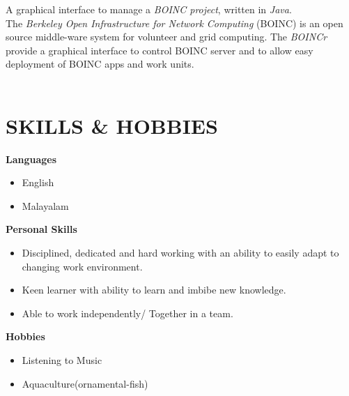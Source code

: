 \documentclass[line,margin]{res}
\begin{document}
\begin{resume}
	     	  A graphical interface to manage a {\it BOINC project}, written in {\it Java}.\\
	     	  The {\it Berkeley Open Infrastructure for Network Computing }(BOINC) is an open source middle-ware system for volunteer and grid computing. The {\it BOINCr} provide a graphical interface to control BOINC server and to allow easy deployment of BOINC apps and work units.\\\\	
	                          
	  \section{SKILLS \& HOBBIES}
	          {\bf Languages}
	          \begin{itemize} \itemsep -2pt
	          \item English
	          \item Malayalam
	          \end{itemize}
	          {\bf Personal Skills}
	          \begin{itemize} \itemsep -2pt
	          \item Disciplined, dedicated and hard working with an ability to easily adapt to changing work environment.
	          \item Keen learner with ability to learn and imbibe new knowledge.
	          \item Able to work independently/ Together in a team.
	          \end{itemize}
	          {\bf Hobbies}
	          \begin{itemize} \itemsep -2pt
	          \item Listening to Music
	          \item Aquaculture(ornamental-fish)
	          \end{itemize}
	          \vspace{10 mm}                                 

\end{resume}
\end{document}
